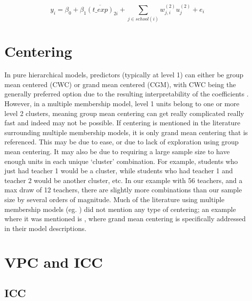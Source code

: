 \documentclass[
]{book}
\begin{document}
\[y_{i} = \beta_{0} + \beta_{1}\overline{(t\_exp)}_{2i} + \sum_{j \in school(i)}w_{j,i}^{(2)}u_{j}^{(2)} + e_{i}\]

\hypertarget{centering}{%
\section{Centering}\label{centering}}

In pure hierarchical models, predictors (typically at level 1) can either be group mean centered (CWC) or grand mean centered (CGM), with CWC being the generally preferred option due to the resulting interpretability of the coefficients \citep{Enders2013}. However, in a multiple membership model, level 1 units belong to one or more level 2 clusters, meaning group mean centering can get really complicated really fast and indeed may not be possible. If centering is mentioned in the literature surrounding multiple membership models, it is only grand mean centering that is referenced. This may be due to ease, or due to lack of exploration using group mean centering. It may also be due to requiring a large sample size to have enough units in each unique `cluster' combination. For example, students who just had teacher 1 would be a cluster, while students who had teacher 1 and teacher 2 would be another cluster, etc. In our example with 56 teachers, and a max draw of 12 teachers, there are slightly more combinations than our sample size by several orders of magnitude. Much of the literature using multiple membership models (eg. \citep[\citet{Heck2022}, \citet{Ma2021}, \citet{Gero2020}]{Leckie2013}) did not mention any type of centering; an example where it was mentioned is \citet{Smith2017}, where grand mean centering is specifically addressed in their model descriptions.

\hypertarget{vpc-and-icc}{%
\section{VPC and ICC}\label{vpc-and-icc}}

\hypertarget{icc}{%
\subsection{ICC}\label{icc}}
\end{document}

